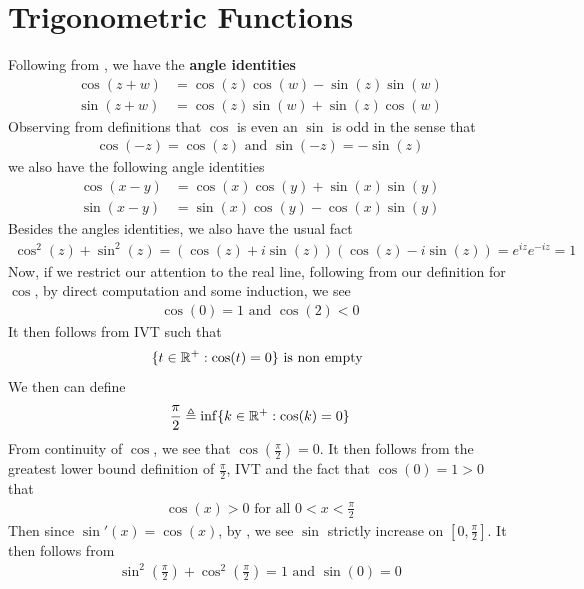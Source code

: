 \documentclass{report}
\begin{document}
\section{Trigonometric Functions}
\begin{mdframed}
Following from , we have the \textbf{angle identities} 
\begin{align*}
\cos (z+w)&= \cos (z)\cos (w)- \sin (z)\sin (w) \\
\sin (z+w)&= \cos (z)\sin (w)+ \sin (z)\cos (w)
\end{align*}
Observing from definitions that $\cos$ is even an $\sin$ is odd in the sense that 
\begin{align*}
\cos (-z)=\cos (z)\text{ and }\sin (-z)=-\sin (z)
\end{align*}
we also have the following angle identities 
\begin{align*}
\cos (x-y)&= \cos (x)\cos (y)+\sin (x)\sin (y) \\
\sin (x-y)&= \sin (x)\cos (y)-\cos (x)\sin (y)
\end{align*}
Besides the angles identities, we also have the usual fact 
\begin{align*}
\cos^2(z)+\sin^2(z)= (\cos (z)+i \sin (z))(\cos (z)-i \sin (z))=e^{iz}e^{-iz}=1
\end{align*}
Now, if we restrict our attention to the real line, following from our definition for $\cos$, by direct computation and some induction, we see 
\begin{align*}
\cos (0)=1\text{ and }\cos (2)<0
\end{align*}
It then follows from IVT such that 
\begin{align*}
\{ t\in\mathbb{R}^+: \cos (t)=0 \}\text{ is non empty }
\end{align*}
We then can define
\begin{align*}
\frac{\pi}{2} \triangleq \inf \{ k\in\mathbb{R}^+:\cos (k)=0 \}
\end{align*}
From continuity of $\cos$, we see that $\cos (\frac{\pi}{2})=0$. It then follows from the greatest lower bound definition of $\frac{\pi}{2}$, IVT and the fact that $\cos (0)=1>0$ that 
\begin{align*}
\cos (x)>0\text{ for all }0<x< \frac{\pi}{2}
\end{align*}
Then since $\sin '(x)=\cos (x)$, by , we see $\sin$ strictly increase on $[0,\frac{\pi}{2}]$. It then follows from 
\begin{align*}
\sin^2 (\frac{\pi}{2})+ \cos^2 (\frac{\pi}{2})=1\text{ and }\sin (0)=0

\end{align*}
\end{mdframed}
\end{document}
